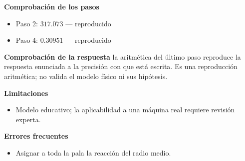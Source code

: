 \documentclass[10pt,openany]{book}
\begin{document}
\begin{tcolorbox}[title={Problema resuelto 3}, studiumworked, breakable]
\noindent\textbf{Comprobación de los pasos}
\begin{itemize}
\item Paso 2: $317.073$ — reproducido
\item Paso 4: $0.30951$ — reproducido
\end{itemize}

\noindent\textbf{Comprobación de la respuesta} la aritmética del último paso reproduce la respuesta enunciada a la precisión con que está escrita. Es una reproducción aritmética; no valida el modelo físico ni sus hipótesis.

\noindent\textbf{Limitaciones}
\begin{itemize}
\item Modelo educativo; la aplicabilidad a una máquina real requiere revisión experta.
\end{itemize}

\noindent\textbf{Errores frecuentes}
\begin{itemize}
\item Asignar a toda la pala la reacción del radio medio.
\end{itemize}
\end{tcolorbox}
\end{document}
